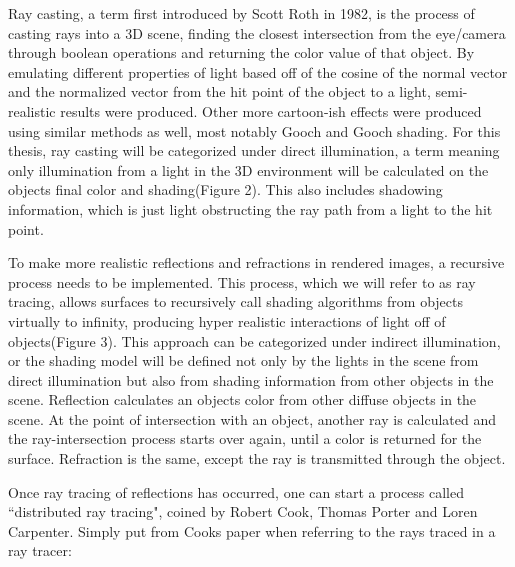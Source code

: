 \documentclass{article}
\begin{document}
Ray casting, a term first introduced by Scott Roth in 1982, is the process of casting rays into a 3D scene, finding the closest intersection from the eye/camera through boolean operations and returning the color value of that object\cite{Roth1982}. By emulating different properties of light based off of the cosine of the normal vector and the normalized vector from the hit point of the object to a light, semi-realistic results were produced\cite{Phong1975,gouraud1971,Blinn:1977,Cook:1987}.  Other more cartoon-ish effects were produced using similar methods as well, most notably Gooch and Gooch shading\cite{Gooch1998}. For this thesis, ray casting will be categorized under direct illumination, a term meaning only illumination from a light in the 3D environment will be calculated on the objects final color and shading(Figure 2).  This also includes shadowing information, which is just light obstructing the ray path from a light to the hit point.

To make more realistic reflections and refractions in rendered images, a recursive process needs to be implemented\cite{Whitted1980}.  This process, which we will refer to as ray tracing, allows surfaces to recursively call shading algorithms from objects virtually to infinity, producing hyper realistic interactions of light off of objects(Figure 3).  This approach can be categorized under indirect illumination, or the shading model will be defined not only by the lights in the scene from direct illumination but also from shading information from other objects in the scene.  Reflection calculates an objects color from other diffuse objects in the scene.  At the point of intersection with an object, another ray is calculated and the ray-intersection process starts over again, until a color is returned for the surface.  Refraction is the same, except the ray is transmitted through the object.

Once ray tracing of reflections has occurred, one can start a process called ``distributed ray tracing", coined by Robert Cook, Thomas Porter and Loren Carpenter\cite{cook1984}. Simply put from Cooks paper when referring to the rays traced in a ray tracer:
\end{document}
